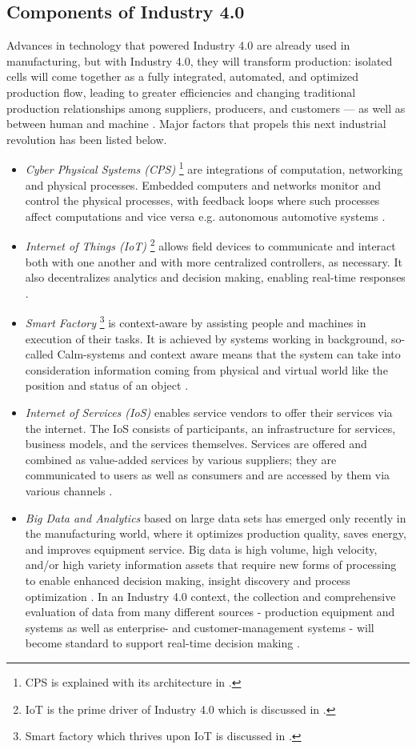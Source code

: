 \subsection{Components of Industry 4.0} \label{compoind4}
Advances in technology that powered Industry 4.0 are already used in manufacturing, but with Industry 4.0, they will transform production: isolated cells will come together as a fully integrated, automated, and optimized production flow, leading to greater efficiencies and changing traditional production relationships among suppliers, producers, and customers — as well as between human and machine \cite{IN4BCG}. Major factors that propels this next industrial revolution has been listed below.
\begin{itemize}
\item \textit{Cyber Physical Systems (\acs{CPS})} \footnote{\acs{CPS} is explained with its architecture in .} are integrations of computation, networking and physical processes. Embedded computers and networks monitor and control the physical processes, with feedback loops where such processes affect computations and vice versa e.g. autonomous automotive systems \cite{IN4DESIGN}.
\item \textit{Internet of Things (\acs{IoT})} \footnote{\acs{IoT} is the prime driver of Industry 4.0 which is discussed in .} allows field devices to communicate and interact both with one another and with more centralized controllers, as necessary. It also decentralizes analytics and decision making, enabling real-time responses \cite{IN4BCG,IN4DESIGN}.
\item \textit{Smart Factory} \footnote{Smart factory which thrives upon \acs{IoT} is discussed in .} is context-aware by assisting people and machines in execution of their tasks. It is achieved by systems working in background, so-called Calm-systems and context aware means that the system can take into consideration information coming 	from physical and virtual world like the position and status of an object \cite{IN4DESIGN}.
\item \textit{Internet of Services (\acs{IoS})} enables service vendors to offer their services via the internet. The \acs{IoS} consists of participants, an infrastructure for services, business models, and the services themselves. Services are offered and combined as value-added services by various suppliers; they are communicated to users as well as consumers and are accessed by them via various channels \cite{IN4DESIGN}.
\item \textit{Big Data and Analytics} based on large data sets has emerged only recently in the manufacturing world, where it optimizes production quality, saves energy, and improves equipment service. Big data is high volume, high velocity, and/or high variety information assets that require new forms of processing to enable enhanced decision making, insight discovery and process optimization \cite{BIGDATA}. In an Industry 4.0 context, the collection and comprehensive evaluation of data from many different sources - production equipment and systems as well as enterprise- and customer-management systems - will become standard to support real-time decision making \cite{IN4BCG,IN4DESIGN}.

\end{itemize}
